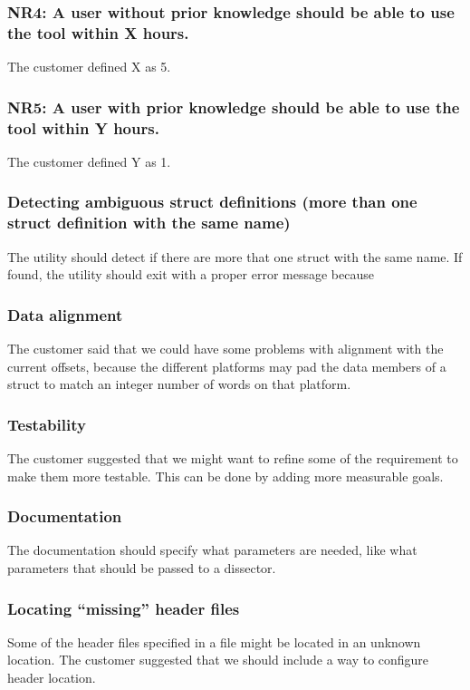\subsubsection{NR4: A user without prior knowledge should be able to use the tool within X hours.}
The customer defined X as 5.

\subsubsection{NR5: A user with prior knowledge should be able to use the tool within Y hours.}
The customer defined Y as 1.

\subsubsection{Detecting ambiguous struct definitions (more than one struct definition with the same name)}
The utility should detect if there are more that one struct with the same name. If found, the utility should exit with a proper error message because 

\subsubsection{Data alignment}
The customer said that we could have some problems with alignment with the current offsets, because the different platforms may pad the data members of a struct to match an integer number of words on that platform.

\subsubsection{Testability}
The customer suggested that we might want to refine some of the requirement to make them more testable. This can be done by adding more measurable goals.

\subsubsection{Documentation}
The documentation should specify what parameters are needed, like what parameters that should be passed to a dissector.

\subsubsection{Locating “missing” header files}
Some of the header files specified in a file might be located in an unknown location. The customer suggested that we should include a way to configure header location.

